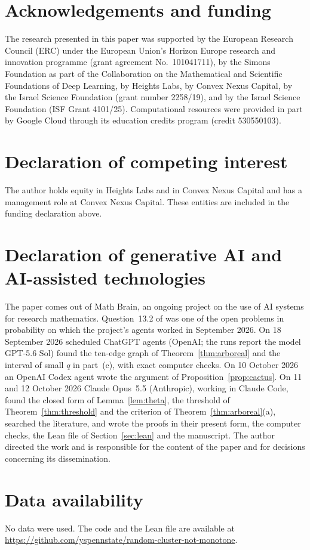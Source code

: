 \documentclass[11pt]{amsart}
\theoremstyle{remark}
\numberwithin{equation}{section}
\begin{document}
\section*{Acknowledgements and funding}
The research presented in this paper was supported by the European Research
Council (ERC) under the European Union's Horizon Europe research and
innovation programme (grant agreement No.~101041711), by the Simons
Foundation as part of the Collaboration on the Mathematical and Scientific
Foundations of Deep Learning, by Heights Labs, by Convex Nexus Capital, by
the Israel Science Foundation (grant number 2258/19), and by the Israel
Science Foundation (ISF Grant 4101/25). Computational resources were
provided in part by Google Cloud through its education credits program
(credit 530550103).

\section*{Declaration of competing interest}
The author holds equity in Heights Labs and in Convex Nexus Capital and
has a management role at Convex Nexus Capital. These entities are included
in the funding declaration above.

\section*{Declaration of generative AI and AI-assisted technologies}
The paper comes out of Math Brain, an ongoing project on the use of AI systems for research mathematics. Question~13.2 of \cite{Pet24} was one of the open problems in probability on which the project's agents worked in September 2026. On 18 September 2026 scheduled ChatGPT agents (OpenAI; the runs report the model GPT-5.6 Sol) found the ten-edge graph of Theorem~\ref{thm:arboreal} and the interval of small $q$ in part~(c), with exact computer checks. On 10 October 2026 an OpenAI Codex agent wrote the argument of Proposition~\ref{prop:cactus}. On 11 and 12 October 2026 Claude Opus~5.5 (Anthropic), working in Claude Code, found the closed form of Lemma~\ref{lem:theta}, the threshold of Theorem~\ref{thm:threshold} and the criterion of Theorem~\ref{thm:arboreal}(a), searched the literature, and wrote the proofs in their present form, the computer checks, the Lean file of Section~\ref{sec:lean} and the manuscript. The author directed the work and is responsible for the content of the paper and for decisions concerning its dissemination.

\section*{Data availability}
No data were used. The code and the Lean file are available at \url{https://github.com/yspennstate/random-cluster-not-monotone}.
\end{document}
